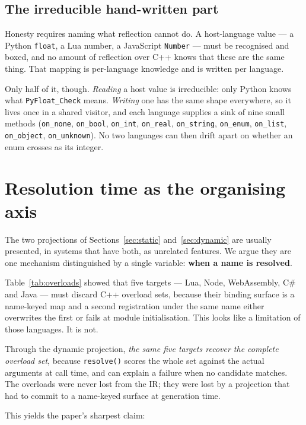 \documentclass[11pt,a4paper]{article}
\newcommand{\code}[1]{\texttt{\small #1}}
\begin{document}
\subsection{The irreducible hand-written part}

Honesty requires naming what reflection cannot do. A host-language value ---
a Python \code{float}, a Lua number, a JavaScript \code{Number} --- must be
recognised and boxed, and no amount of reflection over C++ knows that these are
the same thing. That mapping is per-language knowledge and is written per
language.

Only half of it, though. \emph{Reading} a host value is irreducible: only Python
knows what \code{PyFloat\_Check} means. \emph{Writing} one has the same shape
everywhere, so it lives once in a shared visitor, and each language supplies a
sink of nine small methods (\code{on\_none}, \code{on\_bool}, \code{on\_int},
\code{on\_real}, \code{on\_string}, \code{on\_enum}, \code{on\_list},
\code{on\_object}, \code{on\_unknown}). No two languages can then drift apart on
whether an enum crosses as its integer.

\section{Resolution time as the organising axis}
\label{sec:resolution}

The two projections of Sections~\ref{sec:static} and~\ref{sec:dynamic} are usually presented, in
systems that have both, as unrelated features. We argue they are one mechanism
distinguished by a single variable: \textbf{when a name is resolved}.

Table~\ref{tab:overloads} showed that five targets --- Lua, Node, WebAssembly, C\#
and Java --- must discard C++ overload sets, because their binding surface is a
name-keyed map and a second registration under the same name either overwrites
the first or fails at module initialisation. This looks like a limitation of
those languages. It is not.

Through the dynamic projection, \emph{the same five targets recover the complete
overload set}, because \code{resolve()} scores the whole set against the actual
arguments at call time, and can explain a failure when no candidate matches. The
overloads were never lost from the IR; they were lost by a projection that had
to commit to a name-keyed surface at generation time.

This yields the paper's sharpest claim:
\end{document}
